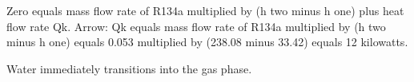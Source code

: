 Zero equals mass flow rate of R134a multiplied by (h two minus h one) plus heat flow rate Qk.  
Arrow: Qk equals mass flow rate of R134a multiplied by (h two minus h one) equals 0.053 multiplied by (238.08 minus 33.42) equals 12 kilowatts.  

Water immediately transitions into the gas phase.